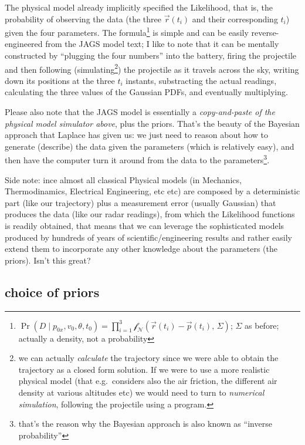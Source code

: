 \documentclass[]{article}
\begin{document}
The physical model already implicitly specified the Likelihood, that is,
the probability of observing the data (the three
\(\overrightarrow{r}(t_i)\) and their corresponding \(t_i\)) given the
four parameters. The formula\footnote{\(\Pr( D \mid p_{0x}, v_0, \theta, t_0 ) = \prod_{i=1}^{3} \mathcal{f_N}(\overrightarrow{r}(t_i) - \overrightarrow{p}(t_i),\,\Sigma)\);
  \(\Sigma\) as before; actually a density, not a probability} is simple
and can be easily reverse-engineered from the JAGS model text; I like to
note that it can be mentally constructed by ``plugging the four
numbers'' into the battery, firing the projectile and then following
(simulating\footnote{we can actually \emph{calculate} the trajectory
  since we were able to obtain the trajectory as a closed form solution.
  If we were to use a more realistic physical model (that e.g.~considers
  also the air friction, the different air density at various altitudes
  etc) we would need to turn to \emph{numerical simulation}, following
  the projectile using a program.}) the projectile as it travels across
the sky, writing down its positions at the three \(t_i\) instants,
substracting the actual readings, calculating the three values of the
Gaussian PDFs, and eventually multiplying.

Please also note that the JAGS model is essentially a
\emph{copy-and-paste of the physical model simulator above}, plus the
priors. That's the beauty of the Bayesian approach that Laplace has
given us: we just need to reason about how to generate (describe) the
data given the parameters (which is relatively easy), and then have the
computer turn it around from the data to the parameters\footnote{that's
  the reason why the Bayesian approach is also known as ``inverse
  probability''}.

Side note: ince almost all classical Physical models (in Mechanics,
Thermodinamics, Electrical Engineering, etc etc) are composed by a
deterministic part (like our trajectory) plus a measurement error
(usually Gaussian) that produces the data (like our radar readings),
from which the Likelihood functions is readily obtained, that means that
we can leverage the sophisticated models produced by hundreds of years
of scientific/engineering results and rather easily extend them to
incorporate any other knowledge about the parameters (the priors). Isn't
this great?

\hypertarget{choice-of-priors}{%
\subsection{choice of priors}\label{choice-of-priors}}
\end{document}
